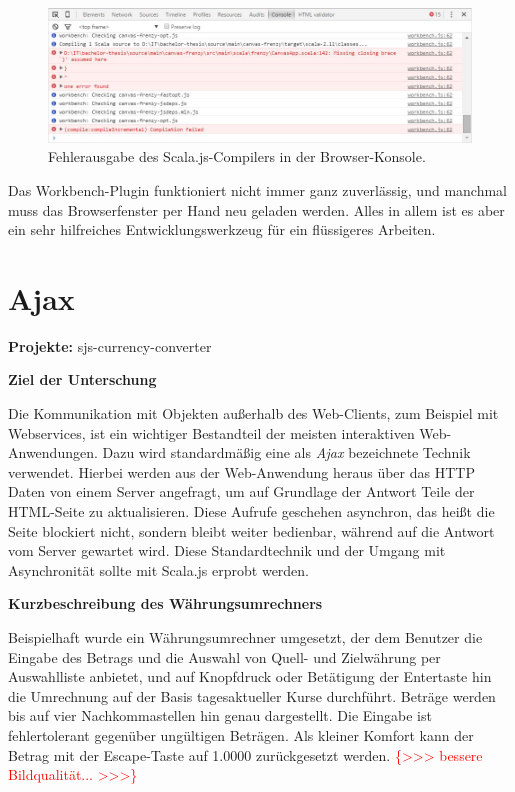 \documentclass[a4paper, 12pt, hidelinks, listof=totoc, listoftables=totoc, bibliography=totoc]{scrreprt}
\newcommand{\TODOi}[1]{\textcolor{red}{\{#1\}}}
\newcommand{\MyMiniSec}[1]{\rmfamily\fontsize{12}{15}\selectfont
	\vspace{7pt}\textbf{#1} %
}
\begin{document}
\begin{figure}[!h]
    \centering
    \includegraphics[width=1.0\textwidth]{workbench-in-action2}
    \caption{Fehlerausgabe des Scala.js-Compilers in der Browser-Konsole.}
    \label{fig:workbench-in-action2}
\end{figure}

Das Workbench-Plugin funktioniert nicht immer ganz zuverlässig, und manchmal muss das Browserfenster per Hand neu geladen werden. Alles in allem ist es aber ein sehr hilfreiches Entwicklungswerkzeug für ein flüssigeres Arbeiten.



\section{Ajax}

\textbf{Projekte:} sjs-currency-converter

\MyMiniSec{Ziel der Unterschung}

Die Kommunikation mit Objekten außerhalb des Web-Clients, zum Beispiel mit Webservices, ist ein wichtiger Bestandteil der meisten interaktiven Web-Anwendungen. Dazu wird standardmäßig eine als \emph{Ajax} bezeichnete Technik verwendet. Hierbei werden aus der Web-Anwendung heraus über das \ac{HTTP} Daten von einem Server angefragt, um auf Grundlage der Antwort Teile der \ac{HTML}-Seite zu aktualisieren. \cite[S.~491]{flanagan2011.JDG} Diese Aufrufe geschehen asynchron, das heißt die Seite blockiert nicht, sondern bleibt weiter bedienbar, während auf die Antwort vom Server gewartet wird. Diese Standardtechnik und der Umgang mit Asynchronität sollte mit Scala.js erprobt werden.


\MyMiniSec{Kurzbeschreibung des Währungsumrechners}

Beispielhaft wurde ein Währungsumrechner umgesetzt, der dem Benutzer die Eingabe des Betrags und die Auswahl von Quell- und Zielwährung per Auswahlliste anbietet, und auf Knopfdruck oder Betätigung der Entertaste hin die Umrechnung auf der Basis tagesaktueller Kurse durchführt. Beträge werden bis auf vier Nachkommastellen hin genau dargestellt. Die Eingabe ist fehlertolerant gegenüber ungültigen Beträgen. Als kleiner Komfort kann der Betrag mit der Escape-Taste auf 1.0000 zurückgesetzt werden. \TODOi{>>> bessere Bildqualität... >>>}
\end{document}
